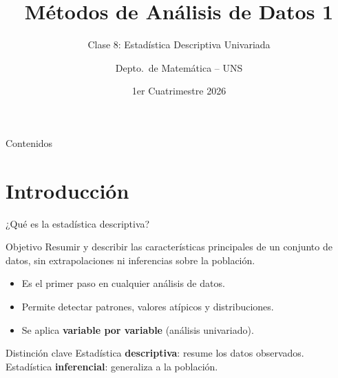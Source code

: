 \documentclass[aspectratio=169]{beamer}
\title{Métodos de Análisis de Datos 1}
\subtitle{Clase 8: Estadística Descriptiva Univariada}
\author{Depto.\ de Matemática -- UNS}
\institute{Universidad Nacional del Sur}
\date{1er Cuatrimestre 2026}
\begin{document}
\begin{frame}
  \titlepage
\end{frame}

\begin{frame}{Contenidos}
  \tableofcontents
\end{frame}

\section{Introducción}

\begin{frame}{¿Qué es la estadística descriptiva?}
  \begin{block}{Objetivo}
    Resumir y describir las características principales de un conjunto de datos, sin extrapolaciones ni inferencias sobre la población.
  \end{block}
  \bigskip
  \begin{itemize}
    \item Es el primer paso en cualquier análisis de datos.
    \item Permite detectar patrones, valores atípicos y distribuciones.
    \item Se aplica \textbf{variable por variable} (análisis univariado).
  \end{itemize}
  \bigskip
  \begin{alertblock}{Distinción clave}
    Estadística \textbf{descriptiva}: resume los datos observados. \quad
    Estadística \textbf{inferencial}: generaliza a la población.
  \end{alertblock}
\end{frame}
\end{document}

